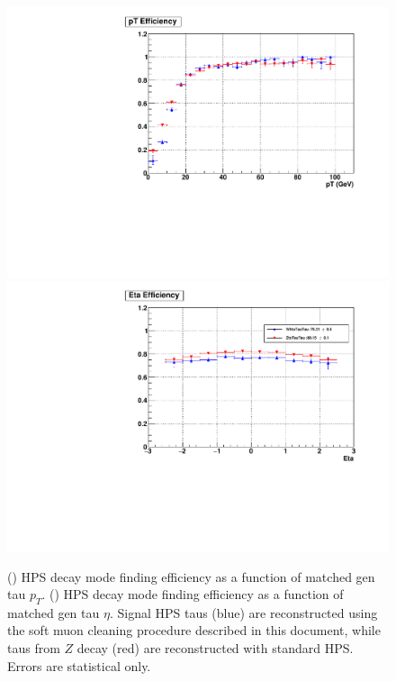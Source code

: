 \begin{figure}[hbtp]
  \begin{center}
    \includegraphics[width=\cmsFigWidth]{figures/gentau_dmf_pt}
    \includegraphics[width=\cmsFigWidth]{figures/gentau_dmf_eta}
    \caption{(\cmsLeft) HPS decay mode finding efficiency as a function of matched gen tau $p_T$. (\cmsRight) HPS decay mode finding efficiency as a function of matched gen tau $\eta$.  Signal HPS taus (blue) are reconstructed using the soft muon cleaning procedure described in this document, while taus from $Z$ decay (red) are reconstructed with standard HPS. Errors are statistical only.}
    \label{fig:eff_dmf}
  \end{center}
\end{figure}

